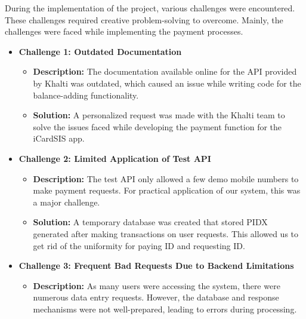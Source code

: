 \documentclass[a4paper,14pt]{article}
\begin{document}
{{{{{{{{{{		\vspace{0.5cm}   
		\newpage
		{
			\noindent \normalsize
			\justifying During the implementation of the project, various challenges were encountered. These challenges required creative problem-solving to overcome. Mainly, the challenges were faced while implementing the payment processes.
			
			\begin{itemize}
				\item \textbf{Challenge 1: Outdated Documentation}
				\begin{itemize}
					\item \textbf{Description:} The documentation available online for the API provided by Khalti was outdated, which caused an issue while writing code for the balance-adding functionality.
					\item \textbf{Solution:} A personalized request was made with the Khalti team to solve the issues faced while developing the payment function for the iCardSIS app.
				\end{itemize}
				
				\item \textbf{Challenge 2: Limited Application of Test API}
				\begin{itemize}
					\item \textbf{Description:} The test API only allowed a few demo mobile numbers to make payment requests. For practical application of our system, this was a major challenge.
					\item \textbf{Solution:} A temporary database was created that stored PIDX generated after making transactions on user requests. This allowed us to get rid of the uniformity for paying ID and requesting ID.
				\end{itemize}
			
			\item \textbf{Challenge 3: Frequent Bad Requests Due to Backend Limitations}
			\begin{itemize}
				\item \textbf{Description:} As many users were accessing the system, there were numerous data entry requests. However, the database and response mechanisms were not well-prepared, leading to errors during processing.
				

\end{itemize}
\end{itemize}}}}}}}}}}}}
\end{document}
